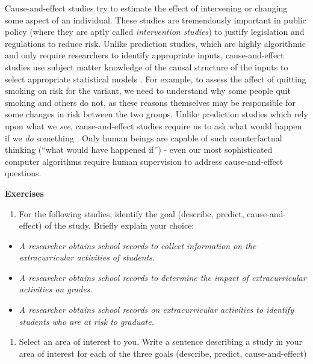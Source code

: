 \documentclass[
]{book}
\providecommand{\tightlist}{%
  \setlength{\itemsep}{0pt}\setlength{\parskip}{0pt}}
\begin{document}
Cause-and-effect studies try to estimate the effect of intervening or changing some aspect of an individual. These studies are tremendously important in public policy (where they are aptly called \emph{intervention studies}) to justify legislation and regulations to reduce risk. Unlike prediction studies, which are highly algorithmic and only require researchers to identify appropriate inputs, cause-and-effect studies use subject matter knowledge of the causal structure of the inputs to select appropriate statistical models \citep{hernan2019second}. For example, to assess the affect of quitting smoking on risk for the variant, we need to understand why some people quit smoking and others do not, as these reasons themselves may be responsible for some changes in risk between the two groups. Unlike prediction studies which rely upon what we \emph{see}, cause-and-effect studies require us to ask what would happen if we \emph{do} something \citep{pearl2018book}. Only human beings are capable of such counterfactual thinking (``what would have happened if'') - even our most sophisticated computer algorithms require human supervision to address cause-and-effect questions.

\textbf{Exercises}

\begin{enumerate}
\def\labelenumi{\arabic{enumi}.}
\tightlist
\item
  For the following studies, identify the goal (describe, predict, cause-and-effect) of the study. Briefly explain your choice:
\end{enumerate}

\begin{itemize}
\item
  \emph{A researcher obtains school records to collect information on the extracurricular activities of students.}
\item
  \emph{A researcher obtains school records to determine the impact of extracurricular activities on grades.}
\item
  \emph{A researcher obtains school records on extracurricular activities to identify students who are at risk to graduate.}
\end{itemize}

\begin{enumerate}
\def\labelenumi{\arabic{enumi}.}
\setcounter{enumi}{1}
\tightlist
\item
  Select an area of interest to you. Write a sentence describing a study in your area of interest for each of the three goals (describe, predict, cause-and-effect)
\end{enumerate}
\end{document}
